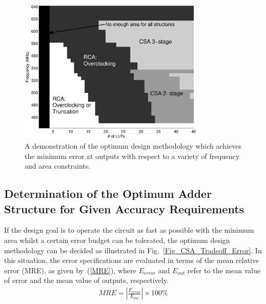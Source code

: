 \documentclass[journal]{IEEEtran}
\begin{document}
\begin{figure}[t]
  \centering
  \includegraphics[width=3.5in]{./Figures/Tradeoff.eps}
  \caption{A demonstration of the optimum design methodology which achieves the minimum error at outputs with respect to a variety of frequency and area constraints.}
  \label{Fig_CSA_Tradeoff}
\end{figure}

\subsection{Determination of the Optimum Adder Structure for Given Accuracy Requirements}
If the design goal is to operate the circuit as fast as possible with the minimum area whilst a certain error budget can be tolerated, the optimum design methodology can be decided as illustrated in Fig.~\ref{Fig_CSA_Tradeoff_Error}. In this situation, the error specifications are evaluated in terms of the mean relative error (MRE), as given by~(\ref{MRE}), where $E_{error}$ and $E_{out}$ refer to the mean value of error and the mean value of outputs, respectively.
\begin{eqnarray}\label{MRE}
  MRE=\left|\frac{E_{error}}{E_{out}}\right|\times 100\%
\end{eqnarray}
\end{document}
